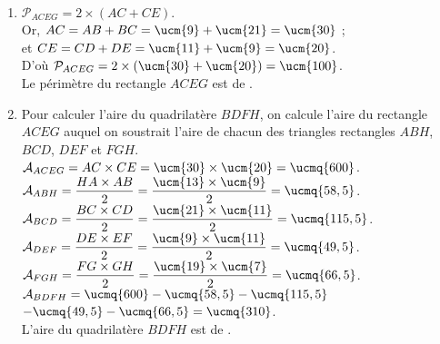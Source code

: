    \ \\ [-5mm]
   \begin{enumerate}
      \item $\mathcal{P}_{ACEG} =2\times(AC+CE)$. \\
         Or, $AC =AB+BC =\ucm{9}+\ucm{21} =\ucm{30}$ ;\\
         et $CE =CD+DE =\ucm{11}+\ucm{9} =\ucm{20}$. \\
         D'où $\mathcal{P}_{ACEG} =2\times(\ucm{30}+\ucm{20}) =\ucm{100}$. \\
         {\blue Le périmètre du rectangle $ACEG$ est de }.
      \item Pour calculer l'aire du quadrilatère $BDFH$, on calcule l'aire du rectangle $ACEG$ auquel on soustrait l'aire de chacun des triangles rectangles $ABH$, $BCD$, $DEF$ et $FGH$. \\
      $\mathcal{A}_{ACEG} =AC\times CE =\ucm{30}\times\ucm{20} =\ucmq{600}$. \\ [1.5mm]
      $\mathcal{A}_{ABH} =\dfrac{HA\times AB}{2} =\dfrac{\ucm{13}\times\ucm{9}}{2} =\ucmq{58,5}$. \\ [1.5mm]
      $\mathcal{A}_{BCD} =\dfrac{BC\times CD}{2} =\dfrac{\ucm{21}\times\ucm{11}}{2} =\ucmq{115,5}$. \\ [1.5mm]
      $\mathcal{A}_{DEF} =\dfrac{DE\times EF}{2} =\dfrac{\ucm{9}\times\ucm{11}}{2} =\ucmq{49,5}$. \\ [1mm]
      $\mathcal{A}_{FGH} = \dfrac{FG\times GH}{2} =\dfrac{\ucm{19}\times\ucm{7}}{2} =\ucmq{66,5}$. \\ [1.5mm]
      $\mathcal{A}_{BDFH} =\ucmq{600}-\ucmq{58,5}-\ucmq{115,5}$ \\
      \hspace*{14mm} $-\ucmq{49,5}-\ucmq{66,5} =\ucmq{310}$. \\
      {\blue L'aire du quadrilatère $BDFH$ est de }.
   \end{enumerate}
